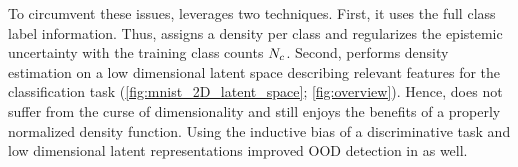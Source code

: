 To circumvent these issues, \PostNetacro leverages two techniques. First, it uses the full class label information. Thus, \PostNetacro assigns a density per class and regularizes the epistemic uncertainty with the training class counts $N_c$. Second, \PostNetacro performs density estimation on a low dimensional latent space describing relevant features for the classification task (\cref{fig:mnist_2D_latent_space}; \cref{fig:overview}).
Hence, \PostNetacro does not suffer from the curse of dimensionality and still enjoys the benefits of a properly normalized density function. Using the inductive bias of a discriminative task and low dimensional latent representations improved OOD detection in  \cite{why-nf-fail-ood} as well.

